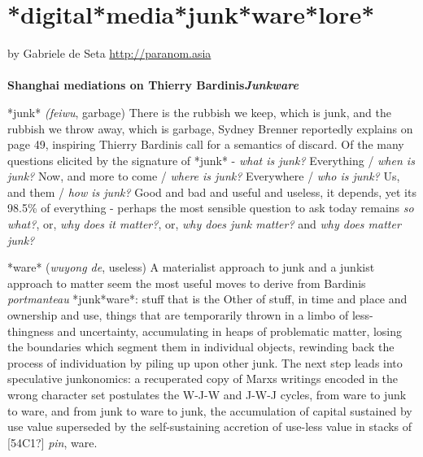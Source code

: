 \section{*digital*media*junk*ware*lore*}
by Gabriele de Seta \url{http://paranom.asia} \\

\\
\textbf{Shanghai mediations on Thierry Bardini{\textquotesingle}s}\textit{\textbf{Junkware}}



*junk*\newline
{} \textit{(feiwu}, garbage)\newline
{\textquotedbl}There is the rubbish we keep, which is junk, and the
rubbish we throw away, which is garbage{\textquotedbl}, Sydney Brenner
reportedly explains on page 49, inspiring Thierry
Bardini{\textquotesingle}s call for a semantics of discard. Of the many
questions elicited by the signature of *junk* - \textit{what
is junk?} Everything / \textit{when is junk?} Now, and more
to come / \textit{where is junk?} Everywhere /
\textit{who is junk? }Us, and them / \textit{how
is junk?} Good and bad and useful and useless, it depends, yet
it{\textquotesingle}s 98.5\% of everything - perhaps the most sensible
question to ask today remains \textit{so what?},
or,\textit{ why does it matter?}, or, \textit{why
does junk matter?} and \textit{why does matter junk?}

*ware*\newline
{}(\textit{wuyong de}, useless)\newline
A materialist approach to junk and a junkist approach to matter seem the
most useful moves to derive from Bardini{\textquotesingle}s
\textit{portmanteau} *junk*ware*: stuff that is the Other of
stuff, in time and place and ownership and use, things that are
temporarily thrown in a limbo of less-thingness and uncertainty,
accumulating in heaps of problematic matter, losing the boundaries
which segment them in individual objects, rewinding back the process of
individuation by piling up upon other junk. The next step leads into
speculative junkonomics: a recuperated copy of Marx{\textquotesingle}s
writings encoded in the wrong character set postulates the W-J-W and
J-W-J cycles, from ware to junk to ware, and from junk to ware to junk,
the accumulation of capital sustained by use value superseded by the
self-sustaining accretion of use-less value in stacks of [54C1?]
\textit{pin}, {\textquotesingle}ware{\textquotesingle}.

